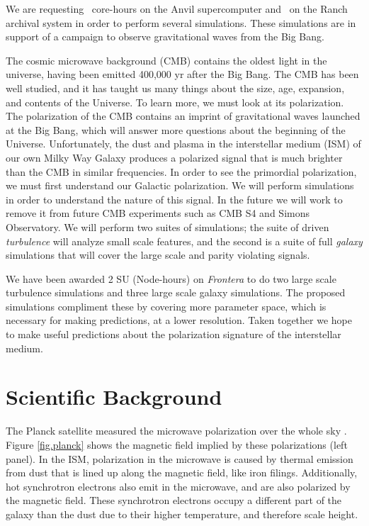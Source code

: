 

We are requesting \SUrequest\ core-hours on the Anvil supercomputer and \diskrequest\ on the Ranch archival system
in order to perform several simulations.  These simulations are in support of a
campaign to observe gravitational waves from the Big Bang.  


The cosmic microwave background (CMB) contains the oldest light in the universe,
having been emitted 400,000 yr after the Big Bang.  The CMB has been well
studied, and it has taught us many things
about the size, age, expansion, and contents of the Universe.  To learn more, we
must look at its polarization.  The polarization of the CMB contains an imprint
of gravitational waves launched at the Big Bang, which will answer more
questions about the beginning of the Universe.  Unfortunately, the dust and
plasma in the interstellar medium (ISM) of our own Milky Way
Galaxy produces a polarized signal that is much brighter than
the CMB in similar frequencies.  In order to see the primordial polarization, we must first understand
our Galactic polarization.  We will perform simulations in order to understand
the nature of this signal.  In the future we will work to remove it from future CMB experiments such as CMB
S4 and Simons Observatory.  We will perform two suites of simulations; the 
suite of driven \emph{turbulence} will analyze small scale features, and the second is
a suite of full \emph{galaxy} simulations that will cover the large scale and parity
violating signals.

We have been awarded 2 SU (Node-hours) on \emph{Frontera} to do two large
scale turbulence simulations and three large scale galaxy simulations.  The
proposed simulations compliment these by covering more parameter space, which is 
necessary for making predictions, at a lower resolution.  Taken together we hope
to make useful predictions about the polarization signature of the interstellar
medium.  



\section{Scientific Background}

The Planck satellite measured the microwave polarization over the whole sky
\citep{Planck18xi}.  Figure
\ref{fig.planck} shows the magnetic field implied by these polarizations (left
panel).  In the ISM, polarization in the microwave is caused by thermal emission
from dust that is lined up along the magnetic field, like iron filings.
Additionally, hot synchrotron electrons also emit in the microwave, and are also
polarized by the magnetic field. These synchrotron electrons occupy  a different part of the galaxy than
the dust due to their higher temperature, and therefore scale height.  

